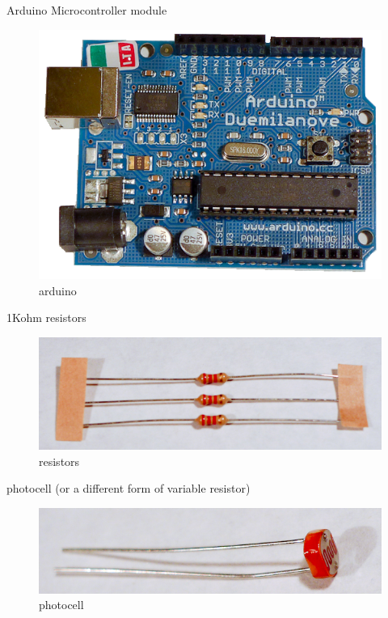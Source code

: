 Arduino Microcontroller module


\begin{figure}[!htb]
 \centering
 \includegraphics[scale=0.3]{img/toneout/arduino.png}
 \caption{arduino}
 \label{arduino}
\end{figure}


1Kohm resistors


\begin{figure}[!htb]
 \centering
 \includegraphics[scale=0.3]{img/toneout/resistors.jpg}
 \caption{resistors}
 \label{resistors}
\end{figure}

photocell (or a different form of variable resistor)
 

\begin{figure}[!htb]
 \centering
 \includegraphics[scale=0.3]{img/toneout/photocell.png}
 \caption{photocell}
 \label{photocell}
\end{figure}

